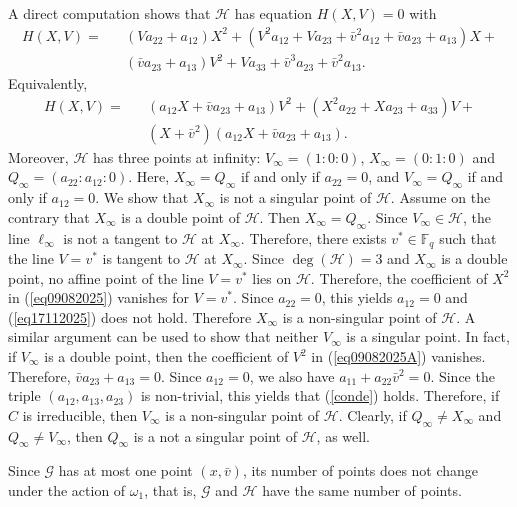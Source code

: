 \documentclass[sn-mathphys-num]{sn-jnl}%
\begin{document}
A direct computation shows that $\mathcal{H}$ has equation $H(X,V)=0$ with
\begin{equation}
\label{eq09082025}
\begin{array}{llll}H(X,V)=&&(Va_{22}+a_{12})X^2+(V^2a_{12}+Va_{23}+\bar{v}^2a_{12}+\bar{v}a_{23}+a_{13})X+\\
&&(\bar{v}a_{23}+a_{13})V^2+Va_{33}+\bar{v}^3a_{23}+\bar{v}^2a_{13}.
\end{array}
\end{equation}
Equivalently,
\begin{equation}
\label{eq09082025A}
\begin{array}{llll}H(X,V)=&&(a_{12}X+\bar{v}a_{23}+a_{13})V^2+(X^2a_{22}+Xa_{23}+a_{33})V+\\
&& (X+\bar{v}^2)(a_{12}X+\bar{v}a_{23}+a_{13}).
\end{array}
\end{equation}
Moreover, $\mathcal{H}$ has three points at infinity: $V_\infty=(1:0:0)$, $X_\infty=(0:1:0)$ and $Q_\infty=(a_{22}:a_{12}:0)$. Here,
$X_\infty=Q_\infty$ if and only if $a_{22}=0$, and $V_\infty=Q_\infty$ if and only if $a_{12}=0$.
We show that $X_\infty$ is not a singular point of $\mathcal{H}$. 
Assume on the contrary that $X_\infty$ is a double point of $\mathcal{H}$. Then $X_\infty=Q_\infty$. Since $V_\infty\in\mathcal{H}$, the line $\ell_\infty$ is not a tangent to $\mathcal{H}$ at $X_\infty$. Therefore, there exists $v^*\in \mathbb{F}_q$ such that the line  $V=v^*$ is tangent to $\mathcal{H}$ at $X_\infty$. Since $\deg(\mathcal{H})=3$ and $X_\infty$ is a double point, no affine point of the line $V=v^*$ lies on $\mathcal{H}$. Therefore, the coefficient of $X^2$ in (\ref{eq09082025}) vanishes for $V=v^*$. Since $a_{22}=0$, this yields $a_{12}=0$ and (\ref{eq17112025}) does not hold. 
Therefore $X_\infty$ is a non-singular point of $\mathcal{H}$. A similar argument can be used to show that neither $V_\infty$ is a singular point. In fact, if $V_\infty$ is a double point, then the coefficient of  $V^2$ in (\ref{eq09082025A}) vanishes. Therefore, 
$\bar{v}a_{23}+a_{13}=0$. Since $a_{12}=0$, we also have $a_{11}+a_{22}\bar{v}^2=0$. Since the triple $(a_{12},a_{13},a_{23})$ is non-trivial, this yields that (\ref{conde}) holds. Therefore, if $C$ is irreducible, then $V_\infty$ is a non-singular point of $\mathcal{H}$. Clearly, if $Q_\infty\ne X_\infty$ and $Q_\infty\ne V_\infty$, then $Q_\infty$ is a not a singular point of $\mathcal{H}$, as well.  

Since $\mathcal{G}$ has at most one point $(x,\bar{v})$, its number of points does not change under the action of $\omega_1$, that is, $\mathcal{G}$ and $\mathcal{H}$ have the same number of points.
\end{document}

